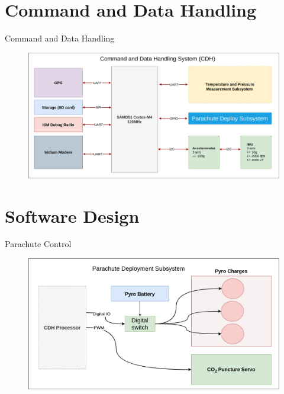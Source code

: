 \documentclass[UKenglish]{beamer}
\begin{document}
\section{Command and Data Handling}
\begin{frame}{Command and Data Handling}
	
	\begin{figure}[h!]
		\centering
		\includegraphics[width=\textwidth]{images/amtps-main-system.png}
	\end{figure}
	
\end{frame}


\section{Software Design}
\begin{frame}{Parachute Control}

	\begin{figure}[h!]
		\centering
		\includegraphics[width=\textwidth]{images/amtps-parachute.png}
	\end{figure}
	
\end{frame}
\end{document}
